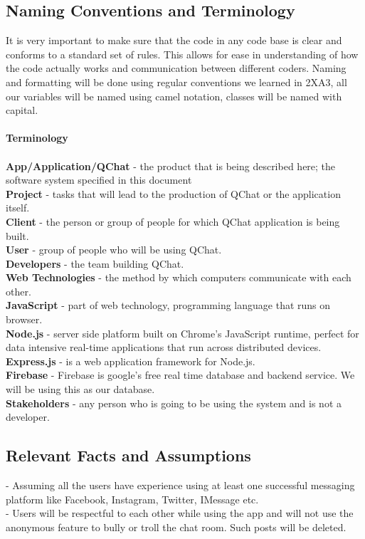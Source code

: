 \documentclass[12pt, titlepage]{article}
\begin{document}
\subsection{Naming Conventions and Terminology}
It is very important to make sure that the code in any code base is clear and conforms to a standard set of rules. This allows for ease in understanding of how the code actually works and communication between different coders. Naming and formatting will be done using regular conventions we learned in 2XA3, all our variables will be named using camel notation, classes will be named with capital.\\
\\
\textbf{Terminology} \\
\\
\textbf{App/Application/QChat} - the product that is being described here; the software system specified in this document \\
\textbf{Project} - tasks that will lead to the production of QChat or the application itself. \\
\textbf{Client} - the person or group of people for which QChat application is being built. \\
\textbf{User} - group of people who will be using QChat. \\
\textbf{Developers} - the team building QChat. \\
\textbf{Web Technologies} - the method by which computers communicate with each other. \\
\textbf{JavaScript} - part of web technology, programming language that runs on browser. \\
\textbf{Node.js} - server side platform built on Chrome’s JavaScript runtime, perfect for data intensive real-time applications that run across distributed devices. \\
\textbf{Express.js} - is a web application framework for Node.js. \\
\textbf{Firebase} - Firebase is google’s free real time database and backend service. We will be using this as our database. \\
\textbf{Stakeholders} - any person who is going to be using the system and is not a developer.

\subsection{Relevant Facts and Assumptions}

 - Assuming all the users have experience using at least one successful messaging platform like Facebook, Instagram, Twitter, IMessage etc. \\
- Users will be respectful to each other while using the app and will not use the anonymous feature to bully or troll the chat room. Such posts will be deleted.
\end{document}
